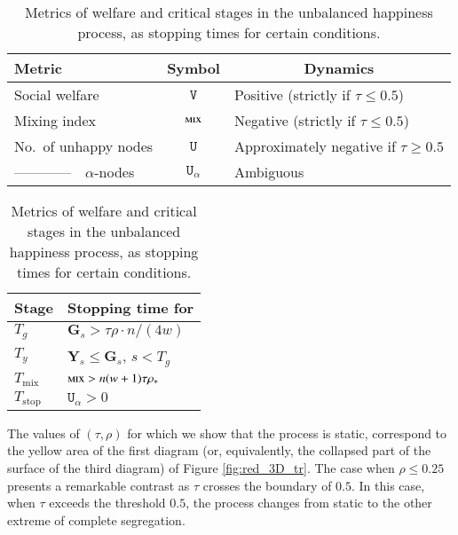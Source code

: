 \documentclass[11pt]{article}
\newcommand*{\ditto}{------\raisebox{-0.5ex}{\textquotedbl}------\ \ }
\theoremstyle{plain}
\numberwithin{equation}{subsection}
\newcommand{\GG}{\mathbf{G}}
\newcommand{\YY}{\mathbf{Y}}
\newcommand{\mix}{\textsc{mix}}
\newcommand{\unhap}{\mathtt{U}}
\begin{document}
\begin{table}
\caption{Metrics of welfare and
critical stages in the unbalanced happiness 
process, as stopping times for certain conditions.}\label{ta:validprglobbouatd}
\colorbox{black!10}{  \begin{tabular}{lcl}
    \multicolumn{1}{l}{\bf\small Metric} &
        \multicolumn{1}{c}{\bf\small Symbol}& 
    \multicolumn{1}{c}{\bf\small Dynamics} \\[1ex]
\toprule
{\small Social welfare}&  {\small $\mathtt{V}$} &{\small Positive (strictly  if $\tau\leq 0.5$)} \\[1ex]
{\small Mixing index} &  {\small $\mix$} &{\small Negative  (strictly  if $\tau\leq 0.5$)} \\[1ex]
  {\small No.\ of unhappy nodes} &  {\small $\unhap$} &{\small Approximately negative if $\tau\geq 0.5$} \\[1ex]
\ditto {\small $\alpha$-nodes}
&  {\small $\unhap_{\alpha}$}   
& {\small Ambiguous} 
\end{tabular}}
\quad
\colorbox{black!10}{ \begin{tabular}{ll}
   \multicolumn{1}{c}{\bf\small Stage} &
    \multicolumn{1}{l}{\bf\small  Stopping time for}      \\[1ex]
 \toprule
{\small $T_g$} &{\small $\GG_s> \tau\rho\cdot n/(4w)$ }\\[1ex]
{\small $T_y$} & {\small $\YY_s\leq \GG_s$, $s< T_g$} \\[1ex]
{\small $T_{\textrm{mix}}$}  &{\small $\mix >n(w+1)\tau\rho_{\ast}$}\\[1ex]
{\small $T_{\textrm{stop}}$}  &{\small $\unhap_{\alpha}>0$}
\end{tabular} } 
\centering
\end{table}


The values of $(\tau,\rho)$ for which we show that the process is static, correspond to the yellow
area of the first diagram (or, equivalently, the collapsed part of the surface of the third diagram) 
of Figure \ref{fig:red_3D_tr}. 
The case when $\rho\leq 0.25$ presents a remarkable contrast as $\tau$ crosses the
boundary of $0.5$. In this case, when $\tau$ exceeds  the
threshold $0.5$, the process changes from static to the other extreme of 
complete segregation.
\end{document}
